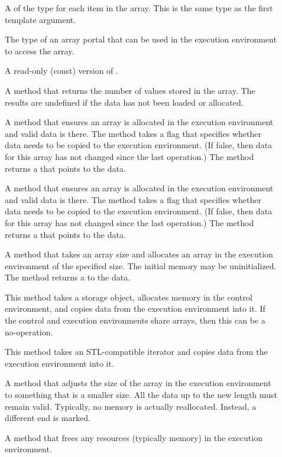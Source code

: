 \begin{description}
\item[] A  of the type for each item
  in the array. This is the same type as the first template argument.
\item[] The type of an array portal that can be used
  in the execution environment to access the array.
\item[] A read-only (const) version of
  .
\item[] A method that returns the number of
  values stored in the array. The results are undefined if the data has not
  been loaded or allocated.
\item[] A method that ensures an array is
  allocated in the execution environment and valid data is there. The
  method takes a  flag that specifies whether data needs to
  be copied to the execution environment. (If false, then data for this
  array has not changed since the last operation.) The method returns a
   that points to the data.
\item[] A method that ensures an array is
  allocated in the execution environment and valid data is there. The
  method takes a  flag that specifies whether data needs to
  be copied to the execution environment. (If false, then data for this
  array has not changed since the last operation.) The method returns a
   that points to the data.
\item[] A method that takes an array
  size and allocates an array in the execution environment
  of the specified size. The initial memory may be uninitialized. The
  method returns a  to the data.
\item[] This method takes a storage object,
  allocates memory in the control environment, and copies data from the
  execution environment into it. If the control and execution environments
  share arrays, then this can be a no-operation.
\item[] This method takes an STL-compatible iterator and
  copies data from the execution environment into it.
\item[] A method that adjusts the size of the array in the
  execution environment to something that is a smaller size. All the data
  up to the new length must remain valid. Typically, no memory is actually
  reallocated. Instead, a different end is marked.
\item[] A method that frees any resources
  (typically memory) in the execution environment.
\end{description}

